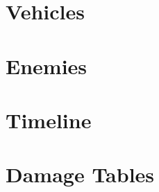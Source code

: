 \documentclass[openany]{report}
\begin{document}
\chapter {Vehicles}

\chapter{Enemies}



\chapter{Timeline}


\chapter{Damage Tables}


 

\end{document}
